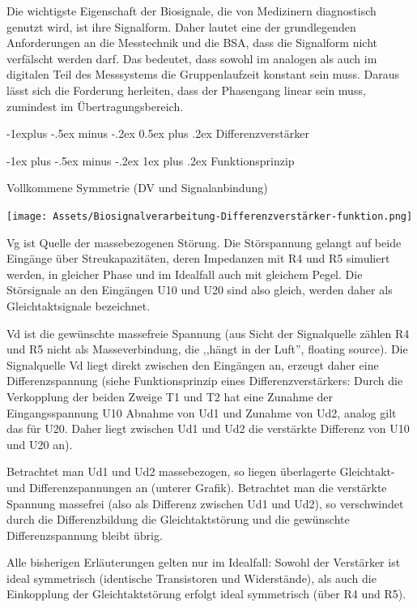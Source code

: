 \documentclass[a4paper]{article}
\makeatletter
\renewcommand{\subsection}{\@startsection{subsection}{2}{0mm}%
 {-1explus -.5ex minus -.2ex}%
 {0.5ex plus .2ex}%
 {\normalfont\normalsize\bfseries}}
\renewcommand{\subsubsection}{\@startsection{subsubsection}{3}{0mm}%
 {-1ex plus -.5ex minus -.2ex}%
 {1ex plus .2ex}%
 {\normalfont\small\bfseries}}
\makeatother
\begin{document}
\begin{multicols}{3}
  Die wichtigste Eigenschaft der Biosignale, die von Medizinern
  diagnostisch genutzt wird, ist ihre Signalform. Daher lautet eine der
  grundlegenden Anforderungen an die Messtechnik und die BSA, dass die
  Signalform nicht verfälscht werden darf. Das bedeutet, dass sowohl im
  analogen als auch im digitalen Teil des Messsystems die Gruppenlaufzeit
  konstant sein muss. Daraus lässt sich die Forderung herleiten, dass der
  Phasengang linear sein muss, zumindest im Übertragungsbereich.

  \subsection{Differenzverstärker}\label{differenzverstuxe4rker}

  \subsubsection{Funktionsprinzip}\label{funktionsprinzip}

  Vollkommene Symmetrie (DV und Signalanbindung)

  \begin{itemize*}
    \item \texttt{[image: Assets/Biosignalverarbeitung-Differenzverstärker-funktion.png]}
    \item Vg ist Quelle der massebezogenen Störung. Die Störspannung gelangt auf beide Eingänge über Streukapazitäten, deren Impedanzen mit R4 und R5 simuliert werden, in gleicher Phase und im Idealfall auch mit gleichem Pegel. Die Störsignale an den Eingängen U10 und U20 sind also gleich, werden daher als Gleichtaktsignale bezeichnet.
    \item Vd ist die gewünschte massefreie Spannung (aus Sicht der Signalquelle zählen R4 und R5 nicht als Masseverbindung, die ,,hängt in der Luft'', floating source). Die Signalquelle Vd liegt direkt zwischen den Eingängen an, erzeugt daher eine Differenzspannung (siehe Funktionsprinzip eines Differenzverstärkers: Durch die Verkopplung der beiden Zweige T1 und T2 hat eine Zunahme der Eingangsspannung U10 Abnahme von Ud1 und Zunahme von Ud2, analog gilt das für U20. Daher liegt zwischen Ud1 und Ud2 die verstärkte Differenz von U10 und U20 an).
    \item Betrachtet man Ud1 und Ud2 massebezogen, so liegen überlagerte Gleichtakt- und Differenzspannungen an (unterer Grafik). Betrachtet man die verstärkte Spannung massefrei (also als Differenz zwischen Ud1 und Ud2), so verschwindet durch die Differenzbildung die Gleichtaktstörung und die gewünschte Differenzspannung bleibt übrig.
    \item Alle bisherigen Erläuterungen gelten nur im Idealfall: Sowohl der Verstärker ist ideal symmetrisch (identische Transistoren und Widerstände), als auch die Einkopplung der Gleichtaktstörung erfolgt ideal symmetrisch (über R4 und R5).
  \end{itemize*}


\end{multicols}
\end{document}
